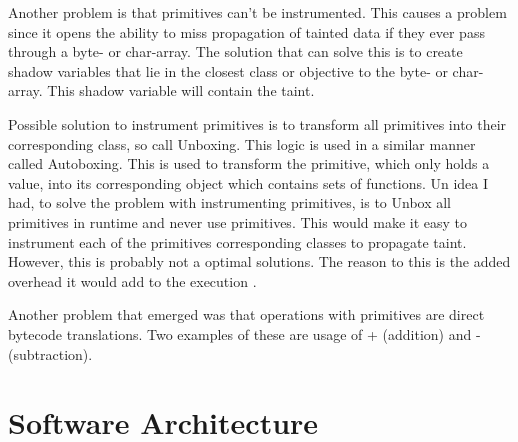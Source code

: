 Another problem is that primitives can't be instrumented. This causes a problem since it opens the ability to miss propagation of tainted data if they ever pass through a byte- or char-array. The solution that can solve this is to create shadow variables that lie in the closest class or objective to the byte- or char-array. This shadow variable will contain the taint.

Possible solution to instrument primitives is to transform all primitives into their corresponding class, so call Unboxing. This logic is used in a similar manner called Autoboxing. This is used to transform the primitive, which only holds a value, into its corresponding object which contains sets of functions. Un idea I had, to solve the problem with instrumenting primitives, is to Unbox all primitives in runtime and never use primitives. This would make it easy to instrument each of the primitives corresponding classes to propagate taint. However, this is probably not a optimal solutions. The reason to this is the added overhead it would add to the execution \parencite{BlochJoshua2008EJ}. 

Another problem that emerged was that operations with primitives are direct bytecode translations. Two examples of these are usage of + (addition) and - (subtraction).

\section{Software Architecture}
\label{SoftwareArchitecture}







